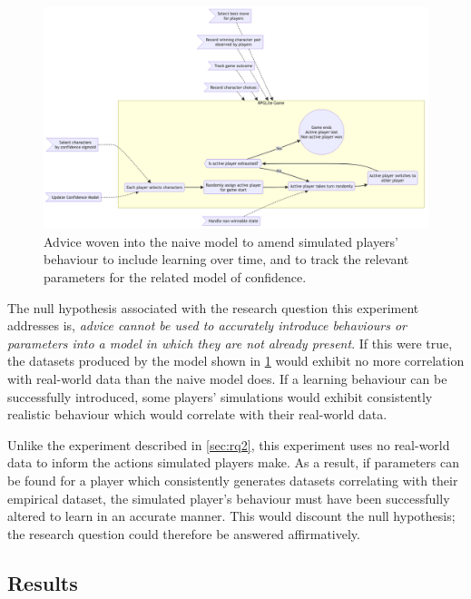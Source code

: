 \begin{figure}[h]
  \centering
  \includegraphics[width=\columnwidth]{70_generality_of_aspects/diagrams/exp3_learning_model.png}
  \caption{Advice woven into the naive model to amend simulated players' behaviour to include learning over time, and to track the relevant parameters for the related model of confidence.}
  \label{fig:learning_model_software_diagram}
\end{figure}

The null hypothesis associated with the research question this experiment
addresses is, \emph{advice cannot be used to accurately introduce behaviours or
parameters into a model in which they are not already present}. If this were
true, the datasets produced by the \aspectoriented model shown in
\cref{fig:learning_model_software_diagram} would exhibit no more correlation with
real-world data than the naive model does. If a learning behaviour can be
successfully introduced, some players' simulations would exhibit consistently
realistic behaviour which would correlate with their real-world data.

Unlike the experiment described in \cref{sec:rq2}, this experiment uses no
real-world data to inform the actions simulated players make. As a result, if
parameters can be found for a player which consistently generates datasets
correlating with their empirical dataset, the simulated player's behaviour must
have been successfully altered to learn in an accurate manner. This would
discount the null hypothesis; the research question could therefore be answered
affirmatively.




\subsection{Results}

